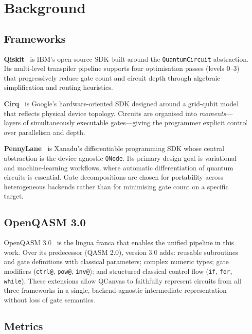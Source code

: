 \section{Background}

\subsection{Frameworks}

\textbf{Qiskit}~\cite{qiskit} is IBM's open-source SDK built around the
\texttt{QuantumCircuit} abstraction.
Its multi-level transpiler pipeline supports four optimisation passes
(levels 0--3) that progressively reduce gate count and circuit depth
through algebraic simplification and routing heuristics.

\textbf{Cirq}~\cite{cirq} is Google's hardware-oriented SDK designed
around a grid-qubit model that reflects physical device topology.
Circuits are organised into \emph{moments}---layers of simultaneously
executable gates---giving the programmer explicit control over
parallelism and depth.

\textbf{PennyLane}~\cite{bergholm2018pennylane} is Xanadu's
differentiable programming SDK whose central abstraction is the
device-agnostic \texttt{QNode}.
Its primary design goal is variational and machine-learning workflows,
where automatic differentiation of quantum circuits is essential.
Gate decompositions are chosen for portability across heterogeneous
backends rather than for minimising gate count on a specific target.

\subsection{OpenQASM 3.0}
OpenQASM 3.0~\cite{cross2022openqasm3} is the lingua franca that enables
the unified pipeline in this work.
Over its predecessor (QASM 2.0), version 3.0 adds: reusable subroutines
and gate definitions with classical parameters; complex numeric types;
gate modifiers (\texttt{ctrl@}, \texttt{pow@}, \texttt{inv@}); and
structured classical control flow (\texttt{if}, \texttt{for},
\texttt{while}).
These extensions allow QCanvas to faithfully represent circuits from all
three frameworks in a single, backend-agnostic intermediate
representation without loss of gate semantics.

\subsection{Metrics}

